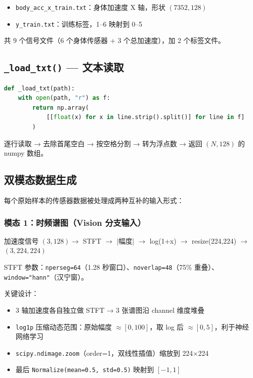 \documentclass[12pt,a4paper]{ctexart}
\newcommand{\file}[1]{\texttt{#1}}
\newcommand{\code}[1]{\texttt{#1}}
\begin{document}
\begin{itemize}
    \item \file{body\_acc\_x\_train.txt}：身体加速度 X 轴，形状 $(7352, 128)$
    \item \file{y\_train.txt}：训练标签，1--6 映射到 0--5
\end{itemize}

共 9 个信号文件（6 个身体传感器 + 3 个总加速度），加 2 个标签文件。

\subsection{\file{\_load\_txt()} — 文本读取}

\begin{lstlisting}[language=Python]
def _load_txt(path):
    with open(path, "r") as f:
        return np.array(
            [[float(x) for x in line.strip().split()] for line in f]
        )
\end{lstlisting}

逐行读取 → 去除首尾空白 → 按空格分割 → 转为浮点数 → 返回 $(N, 128)$ 的 numpy 数组。

\subsection{双模态数据生成}

每个原始样本的传感器数据被处理成两种互补的输入形式：

\subsubsection{模态 1：时频谱图（Vision 分支输入）}

\begin{center}
加速度信号 $(3, 128) \rightarrow$ STFT $\rightarrow$ |幅度| $\rightarrow$ log(1+x) $\rightarrow$ resize(224,224) $\rightarrow$ $(3, 224, 224)$
\end{center}

STFT 参数：\code{nperseg=64}（1.28 秒窗口）、\code{noverlap=48}（75\% 重叠）、\code{window="hann"}（汉宁窗）。

关键设计：
\begin{itemize}
    \item 3 轴加速度各自独立做 STFT → 3 张谱图沿 channel 维度堆叠
    \item \code{log1p} 压缩动态范围：原始幅度 $\approx [0, 100]$，取 log 后 $\approx [0, 5]$，利于神经网络学习
    \item \code{scipy.ndimage.zoom}（order=1，双线性插值）缩放到 224×224
    \item 最后 \code{Normalize(mean=0.5, std=0.5)} 映射到 $[-1, 1]$
\end{itemize}
\end{document}
